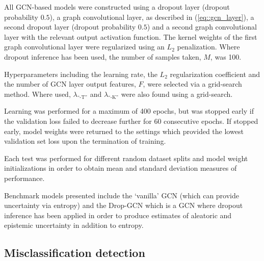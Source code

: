 \documentclass[
twocolumn,
]{ceurart}
\begin{document}
All GCN-based models were constructed using a dropout layer (dropout probability $0.5$), a graph convolutional layer, as described in (\ref{eq::gcn_layer}), a second dropout layer (dropout probability $0.5$) and a second graph convolutional layer with the relevant output activation function.
The kernel weights of the first graph convolutional layer were regularized using an $L_2$ penalization.
Where dropout inference has been used, the number of samples taken, $M$, was 100.

Hyperparameters including the learning rate, the $L_2$ regularization coefficient and the number of GCN layer output features, $F$, were selected via a grid-search method.
Where used, $\lambda_{\text{``-T''}}$ and $\lambda_{\text{``-K''}}$ were also found using a grid-search.

Learning was performed for a maximum of 400 epochs, but was stopped early if the validation loss failed to decrease further for 60 consecutive epochs.
If stopped early, model weights were returned to the settings which provided the lowest validation set loss upon the termination of training.
    
Each test was performed for different random dataset splits and model weight initializations in order to obtain mean and standard deviation measures of performance.

Benchmark models presented include the `vanilla' GCN (which can provide uncertainty via entropy) and the Drop-GCN which is a GCN where dropout inference has been applied in order to produce estimates of aleatoric and epistemic uncertainty in addition to entropy.

\subsection{Misclassification detection}
\end{document}
